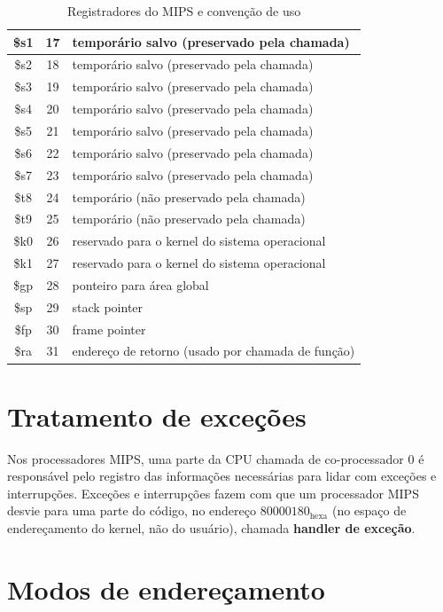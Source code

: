 \documentclass[
	12pt,				%
	oneside,			%
	a4paper,			%
	english,			%
	brazil				%
	]{abntex2ppgsi}
\begin{document}
\begin{table}[h]
\begin{tabular}{c|c|l}
        \$s1 & 17 & temporário salvo (preservado pela chamada)\\ \hline
        \$s2 & 18 & temporário salvo (preservado pela chamada)\\ \hline
        \$s3 & 19 & temporário salvo (preservado pela chamada)\\ \hline
        \$s4 & 20 & temporário salvo (preservado pela chamada)\\ \hline
        \$s5 & 21 & temporário salvo (preservado pela chamada)\\ \hline
        \$s6 & 22 & temporário salvo (preservado pela chamada)\\ \hline
        \$s7 & 23 & temporário salvo (preservado pela chamada)\\ \hline
        \$t8 & 24 & temporário (não preservado pela chamada)\\ \hline
        \$t9 & 25 & temporário (não preservado pela chamada)\\ \hline
        \$k0 & 26 & reservado para o kernel do sistema operacional\\ \hline
        \$k1 & 27 & reservado para o kernel do sistema operacional\\ \hline
        \$gp & 28 & ponteiro para área global\\ \hline
        \$sp & 29 & stack pointer\\ \hline
        \$fp & 30 & frame pointer\\ \hline
        \$ra & 31 & endereço de retorno (usado por chamada de função)\\ \hline\end{tabular}
    \caption{Registradores do MIPS e convenção de uso}
    \label{tabRegistradores}
\end{table}

\section{Tratamento de exceções}

Nos processadores MIPS, uma parte da CPU chamada de co-processador 0 é responsável pelo registro das informações necessárias para lidar com exceções e interrupções. Exceções e interrupções fazem com que um processador MIPS desvie para uma parte do código, no endereço $80000180_{\text{hexa}}$ (no espaço de endereçamento do kernel, não do usuário), chamada \textbf{handler de exceção}.

\section{Modos de endereçamento}
\end{document}

